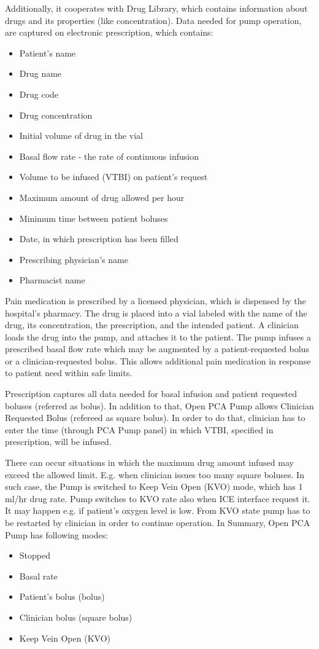 Additionally, it cooperates with Drug Library, which contains information about drugs and its properties (like concentration). Data needed for pump operation, are captured on electronic prescription, which contains:
\begin{itemize}
    \item Patient's name
    \item Drug name
    \item Drug code
    \item Drug concentration
    \item Initial volume of drug in the vial
    \item Basal flow rate - the rate of continuous infusion
    \item Volume to be infused (VTBI) on patient's request
    \item Maximum amount of drug allowed per hour
    \item Minimum time between patient boluses
    \item Date, in which prescription has been filled
    \item Prescribing physician's name
    \item Pharmacist name
\end{itemize}

Pain medication is prescribed by a licensed physician, which is dispensed by the hospital's pharmacy. The drug is placed into a vial labeled with the name of the drug, its concentration, the prescription, and the intended patient. A clinician loads the drug into the pump, and attaches it to the patient. The pump infuses a prescribed basal flow rate which may be augmented by a patient-requested bolus or a clinician-requested bolus. This allows additional pain medication in response to patient need within safe limits. \cite{PcaReq}

Prescription captures all data needed for basal infusion and patient requested boluses (referred as bolus). In addition to that, Open PCA Pump allows Clinician Requested Bolus (refereed as square bolus). In order to do that, clinician has to enter the time (through PCA Pump panel) in which VTBI, specified in prescription, will be infused.

There can occur situations in which the maximum drug amount infused may exceed the allowed limit. E.g. when clinician issues too many square boluses. In such case, the Pump is switched to Keep Vein Open (KVO) mode, which has 1 ml/hr drug rate. Pump switches to KVO rate also when ICE interface request it. It may happen e.g. if patient's oxygen level is low. From KVO state pump has to be restarted by clinician in order to continue operation. In Summary, Open PCA Pump has following modes:
\begin{itemize}
    \item Stopped
    \item Basal rate
    \item Patient's bolus (bolus)
    \item Clinician bolus (square bolus)
    \item Keep Vein Open (KVO)
\end{itemize}

